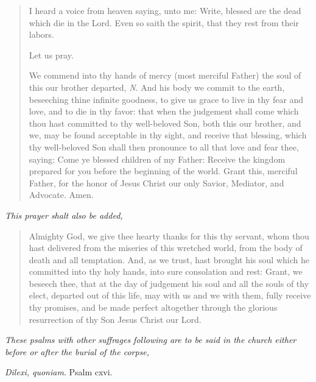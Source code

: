 \documentclass[
]{book}
\begin{document}
\begin{quote}
I heard a voice from heaven saying, unto me: Write, blessed are the dead which die in the Lord. Even so saith the spirit, that they rest from their labors.

Let us pray.

We commend into thy hands of mercy (most merciful Father) the soul of this our brother departed, \emph{N}. And his body we commit to the earth, beseeching thine infinite goodness, to give us grace to live in thy fear and love, and to die in thy favor: that when the judgement shall come which thou hast committed to thy well-beloved Son, both this our brother, and we, may be found acceptable in thy sight, and receive that blessing, which thy well-beloved Son shall then pronounce to all that love and fear thee, saying: Come ye blessed children of my Father: Receive the kingdom prepared for you before the beginning of the world. Grant this, merciful Father, for the honor of Jesus Christ our only Savior, Mediator, and Advocate. Amen.
\end{quote}

\begin{center}
\emph{This prayer shalt also be added,}

\end{center}

\begin{quote}
Almighty God, we give thee hearty thanks for this thy servant, whom thou hast delivered from the miseries of this wretched world, from the body of death and all temptation. And, as we trust, hast brought his soul which he committed into thy holy hands, into sure consolation and rest: Grant, we beseech thee, that at the day of judgement his soul and all the souls of thy elect, departed out of this life, may with us and we with them, fully receive thy promises, and be made perfect altogether through the glorious resurrection of thy Son Jesus Christ our Lord.
\end{quote}

\begin{center}
\emph{These psalms with other suffrages following are to be said in the church either before or after the burial of the corpse,}

\end{center}

\emph{Dilexi, quoniam}. Psalm cxvi.
\end{document}
